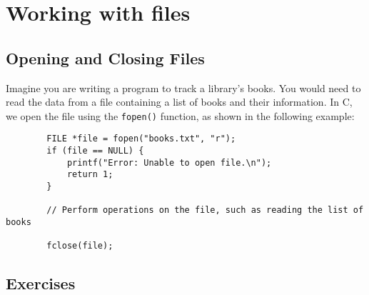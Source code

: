 
\chapter{Working with files}
\label{files}
\section{Opening and Closing Files}
	
	Imagine you are writing a program to track a library's books. You would need to 
	read the data from a file containing a list of books and their information. In C, 
	we open the file using the {\tt fopen()} function, as shown in the following example:
	
\begin{verbatim}
		FILE *file = fopen("books.txt", "r");
		if (file == NULL) {
			printf("Error: Unable to open file.\n");
			return 1;
		}
		
		// Perform operations on the file, such as reading the list of books
		
		fclose(file);
\end{verbatim}
	


\section{Exercises}
\setcounter{exercisenum}{0}




